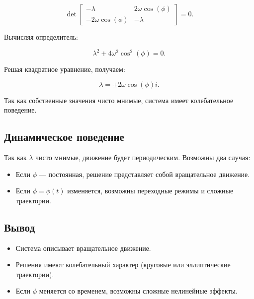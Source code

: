\[
\det \begin{bmatrix} -\lambda & 2\omega \cos(\phi) \\ -2\omega \cos(\phi) & -\lambda \end{bmatrix} = 0.
\]

Вычисляя определитель:

\[
\lambda^2 + 4\omega^2 \cos^2(\phi) = 0.
\]

Решая квадратное уравнение, получаем:

\[
\lambda = \pm 2\omega \cos(\phi) i.
\]

Так как собственные значения чисто мнимые, система имеет колебательное поведение.

\subsection*{Динамическое поведение}
Так как $\lambda$ чисто мнимые, движение будет периодическим. Возможны два случая:
\begin{itemize}
	\item Если $\phi$ — постоянная, решение представляет собой вращательное движение.
	\item Если $\phi = \phi(t)$ изменяется, возможны переходные режимы и сложные траектории.
\end{itemize}


\subsection*{Вывод}
\begin{itemize}
	\item Система описывает вращательное движение.
	\item Решения имеют колебательный характер (круговые или эллиптические траектории).
	\item Если $\phi$ меняется со временем, возможны сложные нелинейные эффекты.
\end{itemize}
